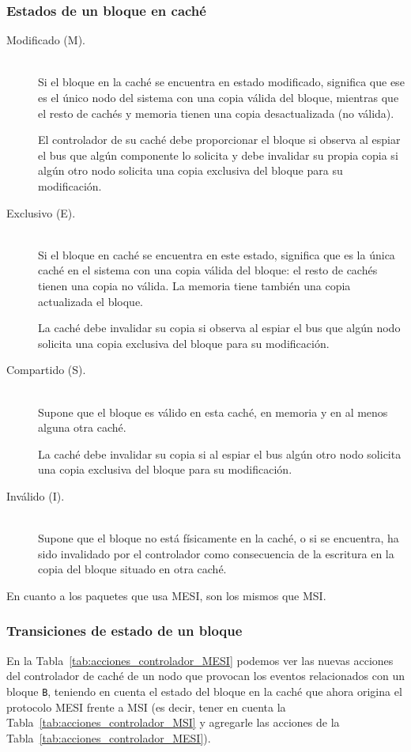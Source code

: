 \subsubsection{Estados de un bloque en caché}
\begin{description}
    \item [Modificado (M).]~\\
        Si el bloque en la caché se encuentra en estado modificado, significa que ese es el único nodo del sistema con una copia válida del bloque, mientras que el resto de cachés y memoria tienen una copia desactualizada (no válida).

        El controlador de su caché debe proporcionar el bloque si observa al espiar el bus que algún componente lo solicita y debe invalidar su propia copia si algún otro nodo solicita una copia exclusiva del bloque para su modificación.
    \item [Exclusivo (E).]~\\
        Si el bloque en caché se encuentra en este estado, significa que es la única caché en el sistema con una copia válida del bloque: el resto de cachés tienen una copia no válida. La memoria tiene también una copia actualizada el bloque. 

        La caché debe invalidar su copia si observa al espiar el bus que algún nodo solicita una copia exclusiva del bloque para su modificación.
    \item [Compartido (S).]~\\
        Supone que el bloque es válido en esta caché, en memoria y en al menos alguna otra caché. 

        La caché debe invalidar su copia si al espiar el bus algún otro nodo solicita una copia exclusiva del bloque para su modificación.
    \item [Inválido (I).]~\\
        Supone que el bloque no está físicamente en la caché, o si se encuentra, ha sido invalidado por el controlador como consecuencia de la escritura en la copia del bloque situado en otra caché.
\end{description}
En cuanto a los paquetes que usa MESI, son los mismos que MSI\@.

\subsubsection{Transiciones de estado de un bloque}
En la Tabla~\ref{tab:acciones_controlador_MESI} podemos ver las nuevas acciones del controlador de caché de un nodo que provocan los eventos relacionados con un bloque \verb|B|, teniendo en cuenta el estado del bloque en la caché que ahora origina el protocolo MESI frente a MSI (es decir, tener en cuenta la Tabla~\ref{tab:acciones_controlador_MSI} y agregarle las acciones de la Tabla~\ref{tab:acciones_controlador_MESI}).

